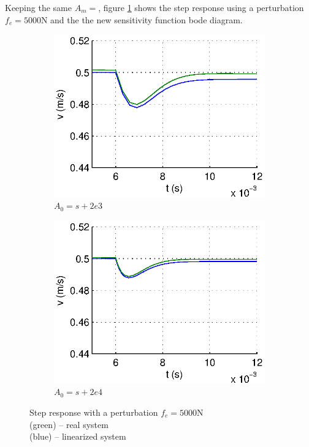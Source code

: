 Keeping the same $A_m = $, figure \ref{stepPertu} shows the step response using a perturbation $f_e = 5000\text{N}$ and the the new sensitivity function bode diagram.

\begin{figure}[hb]
  \centering
  \begin{subfigure}[b]{\linewidth}
   \includegraphics[width=\columnwidth]{fig/step_Fe_AmeqA0.eps}
   \caption{$A_0 = s+2e3$}
  \end{subfigure}
  \begin{subfigure}[b]{\linewidth}
  \includegraphics[width=\columnwidth]{fig/step_Fe_w0Eq10wm.eps}
   \caption{$A_0 = s + 2e4$}
  \end{subfigure}
 \caption{Step response with a perturbation $f_e = 5000 \text{N}$\\ (green) -- real system \\ (blue) -- linearized system}
 \label{stepPertu}
\end{figure}

